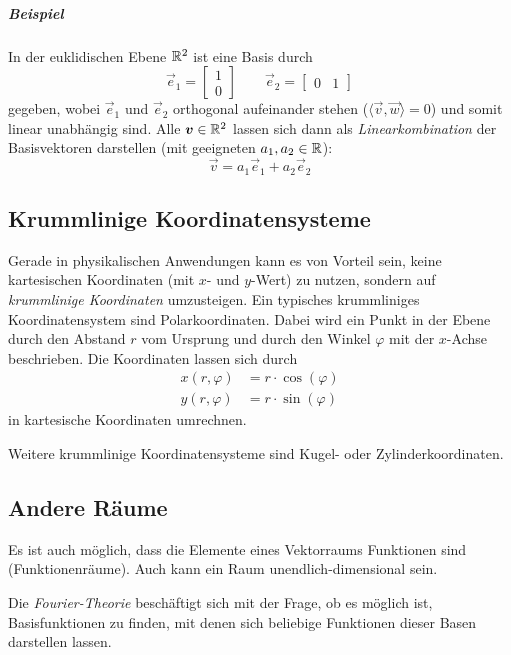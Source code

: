 			\subparagraph{Beispiel}
				In der euklidischen Ebene \( \mathbb{R}^2 \) ist eine Basis durch
				\begin{equation*}
					\vec{e}_1 = \begin{bmatrix} 1 \\ 0 \end{bmatrix} \quad\quad \vec{e}_2 = \begin{bmatrix} 0 & 1 \end{bmatrix}
				\end{equation*}
				gegeben, wobei \(\vec{e}_1\) und \(\vec{e}_2\) orthogonal aufeinander stehen (\( \langle \vec{v}, \vec{w} \rangle = 0 \)) und somit linear unabhängig sind. Alle \( \bm{v} \in \mathbb{R}^2 \) lassen sich dann als \emph{Linearkombination} der Basisvektoren darstellen (mit geeigneten \( a_1, a_2 \in \mathbb{R} \)):
				\begin{equation*}
					\vec{v} = a_1 \vec{e}_1 + a_2 \vec{e}_2
				\end{equation*}

		\subsection{Krummlinige Koordinatensysteme}
			Gerade in physikalischen Anwendungen kann es von Vorteil sein, keine kartesischen Koordinaten (mit \(x\)- und \(y\)-Wert) zu nutzen, sondern auf \emph{krummlinige Koordinaten} umzusteigen. Ein typisches krummliniges Koordinatensystem sind \zB Polarkoordinaten. Dabei wird ein Punkt in der Ebene durch den Abstand \(r\) vom Ursprung und durch den Winkel \(\varphi\) mit der \(x\)-Achse beschrieben. Die Koordinaten lassen sich durch
			\begin{align*}
				x(r, \varphi) & = r \cdot \cos(\varphi) \\
				y(r, \varphi) & = r \cdot \sin(\varphi)
			\end{align*}
			in kartesische Koordinaten umrechnen.

			Weitere krummlinige Koordinatensysteme sind \zB Kugel- oder Zylinderkoordinaten.

		\subsection{Andere Räume}
			Es ist auch möglich, dass die Elemente eines Vektorraums Funktionen sind (Funktionenräume). Auch kann ein Raum unendlich-dimensional sein.

			Die \emph{Fourier-Theorie} beschäftigt sich mit der Frage, ob es möglich ist, Basisfunktionen zu finden, mit denen sich beliebige Funktionen \bzgl dieser Basen darstellen lassen.

